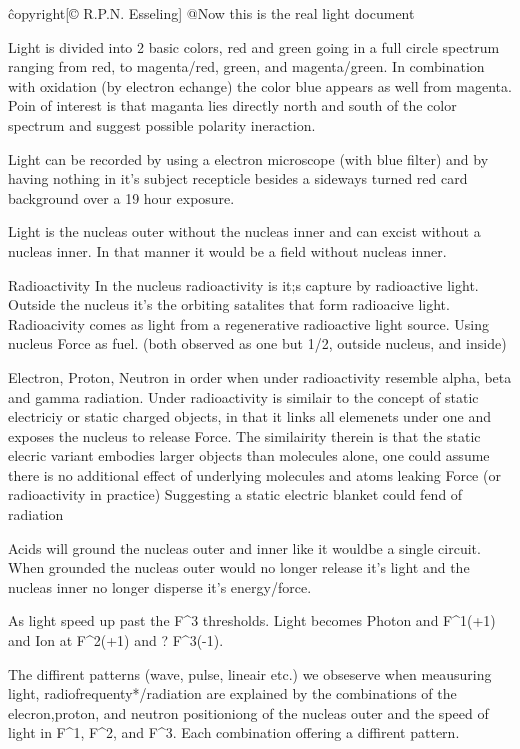 \^copyright{[© R.P.N. Esseling]}
@Now this is the real light document

Light is divided into 2 basic colors, red and green going in a full circle spectrum ranging from red, to magenta/red, green, and magenta/green.
In combination with oxidation (by electron echange) the color blue appears as well from magenta. 
Poin of interest is that maganta lies directly north and south of the color spectrum and suggest possible polarity ineraction.

Light can be recorded by using a electron microscope (with blue filter) and by having nothing in it's subject recepticle besides a sideways turned red card background over a 19 hour exposure.

Light is the nucleas outer without the nucleas inner and can excist without a nucleas inner. In that manner it would be a field without nucleas inner.

Radioactivity
In the nucleus radioactivity is it;s capture by radioactive light.
Outside the nucleus it's the orbiting satalites that form radioacive light. 
Radioacivity comes as light from a regenerative radioactive light source. Using nucleus Force as fuel.
(both observed as one but 1/2, outside nucleus, and inside)

Electron, Proton, Neutron in order when under radioactivity resemble alpha, beta and gamma radiation.
Under radioactivity is similair to the concept of static electriciy or static charged objects, in that it links all elemenets under one and exposes the nucleus to release Force.
The similairity therein is that the static elecric variant embodies larger objects than molecules alone, one could assume there is  no additional effect of underlying molecules and atoms leaking Force (or radioactivity in practice)
Suggesting a static electric blanket could fend of radiation

Acids will ground the nucleas outer and inner like it wouldbe a single circuit. When grounded the nucleas outer would no longer release it's light and the nucleas inner no longer disperse it's energy/force.

As light speed up past the F^3 thresholds. Light becomes Photon and F^1(+1) and Ion at F^2(+1) and ? F^3(-1). 

The diffirent patterns (wave, pulse, lineair etc.) we obseserve when meausuring light, radiofrequenty*/radiation are explained by the combinations of the elecron,proton, 
and neutron positioniong of the nucleas outer and the speed of light in F^1, F^2, and F^3. Each combination offering a diffirent pattern.

